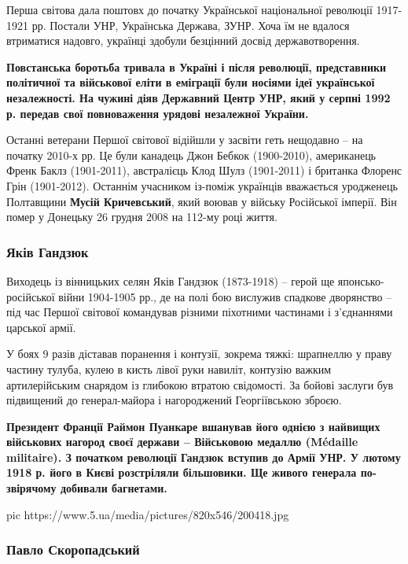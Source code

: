 Перша світова дала поштовх до початку Української національної революції
1917-1921 рр. Постали УНР, Українська Держава, ЗУНР. Хоча їм не вдалося
втриматися надовго, українці здобули безцінний досвід державотворення.

\begin{leftbar}
	\bfseries
Повстанська боротьба тривала в Україні і після революції, представники
політичної та військової еліти в еміграції були носіями ідеї української
незалежності. На чужині діяв Державний Центр УНР, який у серпні 1992 р.
передав свої повноваження урядові незалежної України.
\end{leftbar}

Останні ветерани Першої світової відійшли у засвіти геть нещодавно – на
початку 2010-х рр. Це були канадець Джон Бебкок (1900-2010), американець
Френк Баклз (1901-2011), австралієць Клод Шулз (1901-2011) і британка
Флоренс Грін (1901-2012). Останнім учасником із-поміж українців вважається
уродженець Полтавщини \textbf{Мусій Кричевський}, який воював у війську Російської
імперії. Він помер у Донецьку 26 грудня 2008 на 112-му році життя.

\subsubsection{Яків Гандзюк}

Виходець із вінницьких селян Яків Гандзюк (1873-1918) – герой ще
японсько-російської війни 1904-1905 рр., де на полі бою вислужив спадкове
дворянство – під час Першої світової командував різними піхотними
частинами і з'єднаннями царської армії.

У боях 9 разів діставав поранення і контузії, зокрема тяжкі: шрапнеллю у
праву частину тулуба, кулею в кисть лівої руки навиліт, контузію важким
артилерійським снарядом із глибокою втратою свідомості. За бойові заслуги
був підвищений до генерал-майора і нагороджений Георгіївською зброєю.

\begin{leftbar}
	\bfseries
Президент Франції Раймон Пуанкаре вшанував його однією з найвищих
військових нагород своєї держави – Військовою медаллю (Médaille
militaire). З початком революції Гандзюк вступив до Армії УНР. У лютому
1918 р. його в Києві розстріляли більшовики. Ще живого генерала
по-звірячому добивали багнетами.
\end{leftbar}

\ifcmt
pic https://www.5.ua/media/pictures/820x546/200418.jpg
\fi

\subsubsection{Павло Скоропадський}

